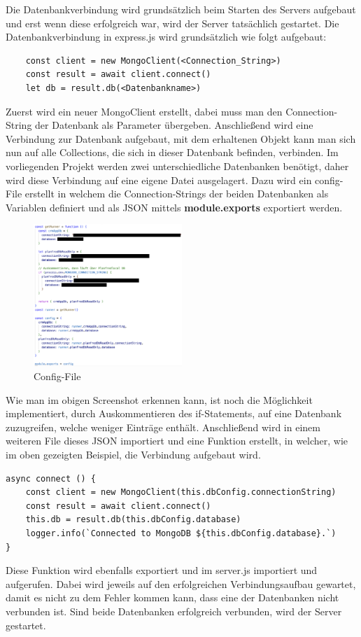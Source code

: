 Die Datenbankverbindung wird grundsätzlich beim Starten des Servers aufgebaut und erst wenn diese erfolgreich war, wird der Server tatsächlich gestartet. Die Datenbankverbindung in express.js wird grundsätzlich wie folgt aufgebaut:
\newline
\begin{lstlisting}
    const client = new MongoClient(<Connection_String>)
    const result = await client.connect()
    let db = result.db(<Datenbankname>)
\end{lstlisting}
Zuerst wird ein neuer MongoClient erstellt, dabei muss man den Connection-String der Datenbank als Parameter übergeben. Anschließend wird eine Verbindung zur Datenbank aufgebaut, mit dem erhaltenen Objekt kann man sich nun auf alle Collections, die sich in dieser Datenbank befinden, verbinden. Im vorliegenden Projekt werden zwei unterschiedliche Datenbanken benötigt, daher wird diese Verbindung auf eine eigene Datei ausgelagert.
\newline
Dazu wird ein config-File erstellt in welchem die Connection-Strings der beiden Datenbanken als Variablen definiert und als JSON mittels \textbf{module.exports} exportiert werden.
\newline
\begin{figure}[h!]
    \centering
    \includegraphics[width=0.5\textwidth]{pics/config-file-conn-strings.png}
    \caption{Config-File}
    \label{fig:enter-label}
\end{figure}
\newline
Wie man im obigen Screenshot erkennen kann, ist noch die Möglichkeit implementiert, durch Auskommentieren des if-Statements, auf eine Datenbank zuzugreifen, welche weniger Einträge enthält.
\newline
Anschließend wird in einem weiteren File dieses JSON importiert und eine Funktion erstellt, in welcher, wie im oben gezeigten Beispiel, die Verbindung aufgebaut wird.
\begin{lstlisting}
async connect () {
    const client = new MongoClient(this.dbConfig.connectionString)
    const result = await client.connect()
    this.db = result.db(this.dbConfig.database)
    logger.info(`Connected to MongoDB ${this.dbConfig.database}.`)
}
\end{lstlisting}
Diese Funktion wird ebenfalls exportiert und im server.js importiert und aufgerufen. Dabei wird jeweils auf den erfolgreichen Verbindungsaufbau gewartet, damit es nicht zu dem Fehler kommen kann, dass eine der Datenbanken nicht verbunden ist. Sind beide Datenbanken erfolgreich verbunden, wird der Server gestartet.